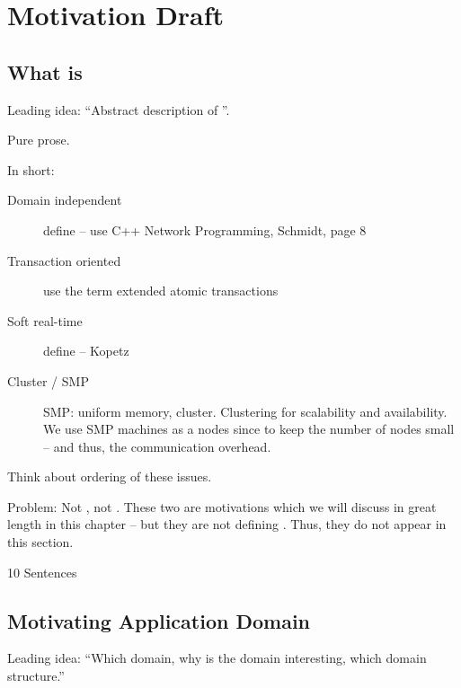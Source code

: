 %

\chapter{Motivation Draft}

\section{What is \SYNEIGHT}
Leading idea: ``Abstract description of \SYNEIGHT''.

Pure prose.

In short:
\begin{description}
\item[Domain independent] define -- use C++ Network Programming,
Schmidt, page 8
\item[Transaction oriented] use the term extended atomic transactions
\item[Soft real-time] define -- Kopetz
\item[Cluster / SMP] SMP: uniform memory, cluster. Clustering for
scalability and availability. We use SMP machines as a nodes since to
keep the number of nodes small -- and thus, the communication
overhead.
\end{description}

Think about ordering of these issues. 

Problem: Not \MMORGS, not \NVES. These two are motivations which we
will discuss in great length in this chapter -- but they are not
defining \SYNEIGHT. Thus, they do not appear in this section.

10 Sentences


\section{Motivating Application Domain}
Leading idea: ``Which domain, why is the domain interesting, which
domain structure.''

